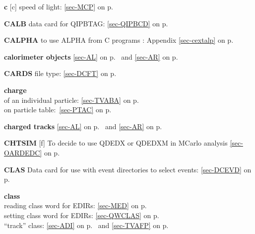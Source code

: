  
 \item{\bf c   }[c] speed of light: \ref{sec-MCP} on p.~\pageref{sec-MCP}\\
 \item{\bf CALB    }data card for QIPBTAG: \ref{sec-QIPBCD} on p.~\pageref{sec-QIPBCD} \\
 \item{\bf CALPHA  }to use ALPHA from C  programs : Appendix \ref{sec-cextalp} on p.~\pageref{sec-cextalp}\\
 \item{\bf calorimeter objects }\ref{sec-AL} on p.~\pageref{sec-AL} and
 \ref{sec-AR} on p.~\pageref{sec-AR}\\
 \item{\bf CARDS   }file type: \ref{sec-DCFT} on p.~\pageref{sec-DCFT}\\
 \item{\bf charge  }\\
 \subitem of an individual particle: \ref{sec-TVABA} on p.~\pageref{sec-TVABA}\\
 \subitem on particle table:~\ref{sec-PTAC} on p.~\pageref{sec-PTAC}\\
 \item{\bf charged tracks  }\ref{sec-AL} on p.~\pageref{sec-AL} and
 \ref{sec-AR} on p.~\pageref{sec-AR}\\
 \item{\bf CHTSIM }[f] To decide to use QDEDX or QDEDXM in MCarlo analysis
 \ref{sec-OARDEDC} on p.~\pageref{sec-OARDEDC}\\
 \item{\bf CLAS    }Data card for use with event directories to select events:
 \ref{sec-DCEVD} on p.~\pageref{sec-DCEVD}\\
 \item{\bf class   }\\
 \subitem reading class word for EDIRs: \ref{sec-MED} on p.~\pageref{sec-MED}\\
 \subitem setting class word for EDIRs: \ref{sec-QWCLAS} on p.~\pageref{sec-QWCLAS}\\
 \subitem ``track'' class: \ref{sec-ADI} on p.~\pageref{sec-ADI} and \ref{sec-TVAFP} on p.~\pageref{sec-TVAFP}
 
